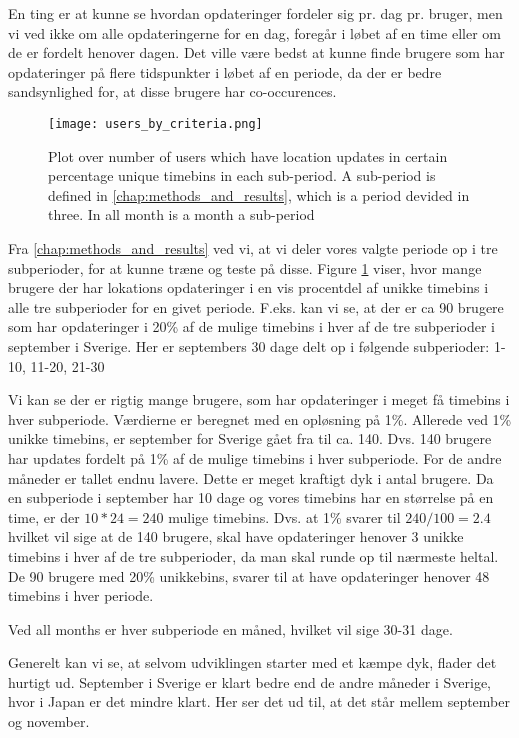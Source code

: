 En ting er at kunne se hvordan opdateringer fordeler sig pr. dag pr. bruger, men vi ved ikke om alle opdateringerne for en dag, foregår i løbet af en time eller om de er fordelt henover dagen. Det ville være bedst at kunne finde brugere som har opdateringer på flere tidspunkter i løbet af en periode, da der er bedre sandsynlighed for, at disse brugere har co-occurences. 


\begin{figure}[H]
    \hspace*{-2.0cm}
    \centering
    \texttt{[image: users\_by\_criteria.png]}
    \caption{Plot over number of users which have location updates in certain percentage unique timebins in each sub-period. A sub-period is defined in \ref{chap:methods_and_results}, which is a period devided in three. In all month is a month a sub-period}
    \label{fig:users_by_criteria}
\end{figure}
Fra \ref{chap:methods_and_results} ved vi, at vi deler vores valgte periode op i tre subperioder, for at kunne træne og teste på disse. Figure \ref{fig:users_by_criteria} viser, hvor mange brugere der har lokations opdateringer i en vis procentdel af unikke timebins i alle tre subperioder for en givet periode. F.eks. kan vi se, at der er ca 90 brugere som har opdateringer i 20\% af de mulige timebins i hver af de tre subperioder i september i Sverige. Her er septembers 30 dage delt op i følgende subperioder: 1-10, 11-20, 21-30

Vi kan se der er rigtig mange brugere, som har opdateringer i meget få timebins i hver subperiode. Værdierne er beregnet med en opløsning på 1\%. Allerede ved 1\% unikke timebins, er september for Sverige gået fra \numberUsersSweden{} til ca. 140. Dvs. 140 brugere har updates fordelt på 1\% af de mulige timebins i hver subperiode. For de andre måneder er tallet endnu lavere. Dette er meget kraftigt dyk i antal brugere. 
Da en subperiode i september har 10 dage og vores timebins har en størrelse på en time, er der $10*24=240$ mulige timebins. Dvs. at 1\% svarer til $240/100=2.4$ hvilket vil sige at de 140 brugere, skal have opdateringer henover 3 unikke timebins i hver af de tre subperioder, da man skal runde op til nærmeste heltal. 
De 90 brugere med 20\% unikkebins, svarer til at have opdateringer henover 48 timebins i hver periode. 

Ved all months er hver subperiode en måned, hvilket vil sige 30-31 dage.  

Generelt kan vi se, at selvom udviklingen starter med et kæmpe dyk, flader det hurtigt ud. September i Sverige er klart bedre end de andre måneder i Sverige, hvor i Japan er det mindre klart. Her ser det ud  til, at det står mellem september og november. 




